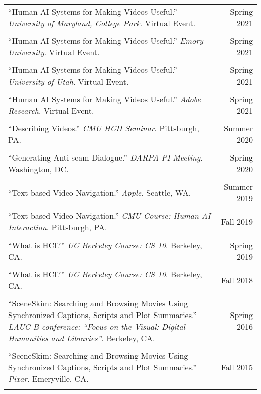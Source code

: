 \begin{longtable}{Xr}
	``Human AI Systems for Making Videos Useful.'' \textit{University of Maryland, College Park}. Virtual Event. & Spring 2021 \\
	\\

	``Human AI Systems for Making Videos Useful.'' \textit{Emory University}. Virtual Event. & Spring 2021 \\
	\\

	``Human AI Systems for Making Videos Useful.'' \textit{University of Utah}. Virtual Event. & Spring 2021 \\
	\\

	``Human AI Systems for Making Videos Useful.'' \textit{Adobe Research}. Virtual Event. & Spring 2021 \\
	\\

	``Describing Videos.'' \textit{CMU HCII Seminar}. Pittsburgh, PA. & Summer 2020 \\
	\\

	``Generating Anti-scam Dialogue.'' \textit{DARPA PI Meeting}. Washington, DC. & Spring 2020 \\
	\\

	``Text-based Video Navigation.'' \textit{Apple}. Seattle, WA. & Summer 2019 \\
	\\

	``Text-based Video Navigation.'' \textit{CMU Course: Human-AI Interaction}. Pittsburgh, PA. & Fall 2019 \\
	\\

	``What is HCI?'' \textit{UC Berkeley Course: CS 10}. Berkeley, CA. & Spring 2019 \\
	\\

	``What is HCI?'' \textit{UC Berkeley Course: CS 10}. Berkeley, CA. & Fall 2018 \\
	\\

	``SceneSkim: Searching and Browsing Movies Using Synchronized Captions, Scripts and Plot Summaries.'' \textit{LAUC-B conference: ``Focus on the Visual: Digital Humanities and Libraries''}. Berkeley, CA. & Spring 2016 \\
	\\

	``SceneSkim: Searching and Browsing Movies Using Synchronized Captions, Scripts and Plot Summaries.'' \textit{Pixar}. Emeryville, CA. & Fall 2015 \\
	\\


\end{longtable}
